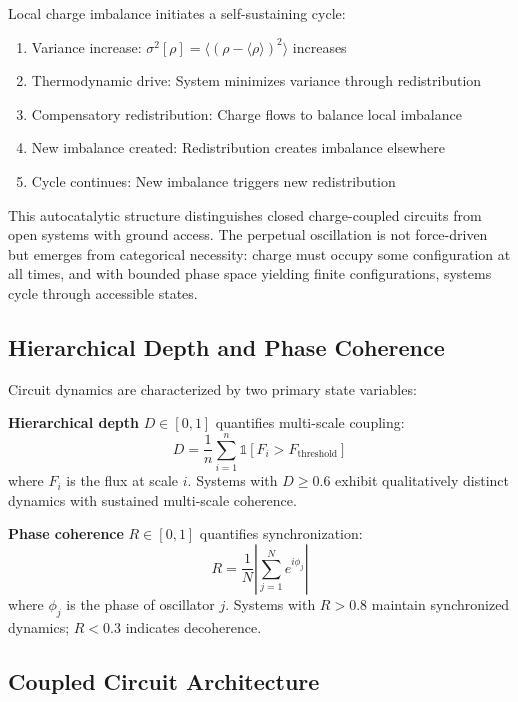 \documentclass[12pt,a4paper]{article}
\theoremstyle{plain}
\theoremstyle{definition}
\theoremstyle{remark}
\begin{document}
Local charge imbalance initiates a self-sustaining cycle:
\begin{enumerate}
\item Variance increase: $\sigma^2[\rho] = \langle (\rho - \langle \rho \rangle)^2 \rangle$ increases
\item Thermodynamic drive: System minimizes variance through redistribution
\item Compensatory redistribution: Charge flows to balance local imbalance
\item New imbalance created: Redistribution creates imbalance elsewhere
\item Cycle continues: New imbalance triggers new redistribution
\end{enumerate}

This autocatalytic structure distinguishes closed charge-coupled circuits from open systems with ground access. The perpetual oscillation is not force-driven but emerges from categorical necessity: charge must occupy some configuration at all times, and with bounded phase space yielding finite configurations, systems cycle through accessible states.

\subsection{Hierarchical Depth and Phase Coherence}

Circuit dynamics are characterized by two primary state variables:

\textbf{Hierarchical depth} $D \in [0,1]$ quantifies multi-scale coupling:
\begin{equation}
D = \frac{1}{n} \sum_{i=1}^{n} \mathbb{1}[F_i > F_{\text{threshold}}]
\end{equation}
where $F_i$ is the flux at scale $i$. Systems with $D \geq 0.6$ exhibit qualitatively distinct dynamics with sustained multi-scale coherence.

\textbf{Phase coherence} $R \in [0,1]$ quantifies synchronization:
\begin{equation}
R = \frac{1}{N} \left| \sum_{j=1}^{N} e^{i\phi_j} \right|
\end{equation}
where $\phi_j$ is the phase of oscillator $j$. Systems with $R > 0.8$ maintain synchronized dynamics; $R < 0.3$ indicates decoherence.

\subsection{Coupled Circuit Architecture}
\end{document}
